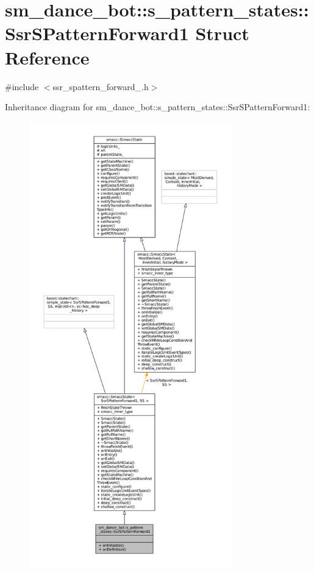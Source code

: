 \hypertarget{structsm__dance__bot_1_1s__pattern__states_1_1SsrSPatternForward1}{}\section{sm\+\_\+dance\+\_\+bot\+:\+:s\+\_\+pattern\+\_\+states\+:\+:Ssr\+S\+Pattern\+Forward1 Struct Reference}
\label{structsm__dance__bot_1_1s__pattern__states_1_1SsrSPatternForward1}


{\ttfamily \#include $<$ssr\+\_\+spattern\+\_\+forward\+\_.\+h$>$}



Inheritance diagram for sm\+\_\+dance\+\_\+bot\+:\+:s\+\_\+pattern\+\_\+states\+:\+:Ssr\+S\+Pattern\+Forward1\+:
\nopagebreak
\begin{figure}[H]
\begin{center}
\leavevmode
\includegraphics[height=550pt]{structsm__dance__bot_1_1s__pattern__states_1_1SsrSPatternForward1__inherit__graph}
\end{center}
\end{figure}



